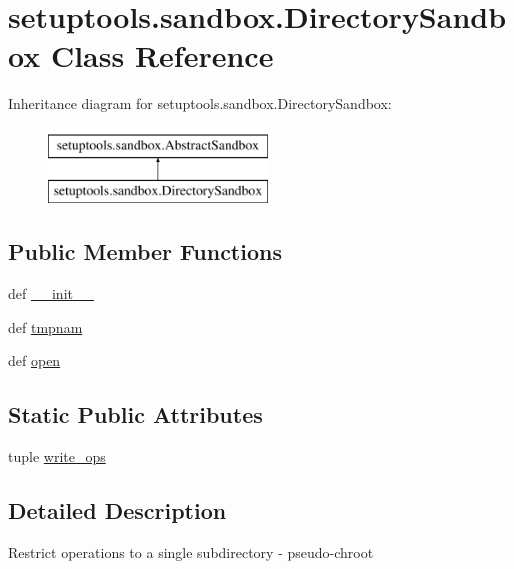\hypertarget{classsetuptools_1_1sandbox_1_1DirectorySandbox}{}\section{setuptools.\+sandbox.\+Directory\+Sandbox Class Reference}
\label{classsetuptools_1_1sandbox_1_1DirectorySandbox}
Inheritance diagram for setuptools.\+sandbox.\+Directory\+Sandbox\+:\begin{figure}[H]
\begin{center}
\leavevmode
\includegraphics[height=2.000000cm]{classsetuptools_1_1sandbox_1_1DirectorySandbox}
\end{center}
\end{figure}
\subsection*{Public Member Functions}
\begin{DoxyCompactItemize}
\item 
def \hyperlink{classsetuptools_1_1sandbox_1_1DirectorySandbox_a4f8c333dce633d69cf3e5d890af5abaa}{\+\_\+\+\_\+init\+\_\+\+\_\+}
\item 
def \hyperlink{classsetuptools_1_1sandbox_1_1DirectorySandbox_ab5ce5a712b90e97938d0dc908ce1d292}{tmpnam}
\item 
def \hyperlink{classsetuptools_1_1sandbox_1_1DirectorySandbox_a3bf28135736bb0e1a59243ed2c9c1277}{open}
\end{DoxyCompactItemize}
\subsection*{Static Public Attributes}
\begin{DoxyCompactItemize}
\item 
tuple \hyperlink{classsetuptools_1_1sandbox_1_1DirectorySandbox_ade74fee61bf690fa11b13c3bbbf216f0}{write\+\_\+ops}
\end{DoxyCompactItemize}


\subsection{Detailed Description}
\begin{DoxyVerb}Restrict operations to a single subdirectory - pseudo-chroot\end{DoxyVerb}
 

